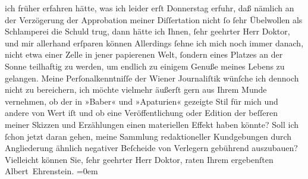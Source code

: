 \begin{ledgroupsized}[t]{13cm}
                    ich früher erfahren hätte, was ich leider erſt Donnerstag erfuhr,
                    daß nämlich an der Verzögerung der Approbation {\pb}meiner
                        Diſſertation nicht ſo
                    ſehr Übelwollen als Schlamperei die Schuld trug, dann hätte ich Ihnen, ſehr
                    geehrter Herr Doktor, und mir allerhand erſparen können{\dotsfour} Allerdings ſehne ich mich noch immer danach, nicht etwa einer Zelle
                    in jener papierenen Welt, ſondern eines Platzes an der Sonne teilhaftig zu
                    werden, um endlich zu einigem Genuße meines Lebens zu gelangen. Meine
                    Perſonalkenntniſſe der Wiener Journaliſtik
                    wünſche ich dennoch nicht zu bereichern, ich möchte vielmehr äußerſt gern aus
                    Ihrem Munde vernehmen, ob der in »Baber« und
                        »Apaturien« gezeigte Stil für mich und
                    andere von Wert iſt und ob eine Veröffentlichung oder Edition der beſſeren
                    meiner Skizzen und Erzählungen einen materiellen Effekt haben könnte? Soll ich
                    ſchon jetzt daran gehen, meine Sammlung redaktioneller Kundgebungen durch
                    Angliederung ähnlich negativer Beſcheide von Verlegern gebührend auszubauen?
                    Vielleicht können Sie, ſehr geehrter Herr Doktor, raten\pend
           \pstart
           Ihrem ergebenſten{\\[\baselineskip]}\spacefill\mbox{Albert Ehrenstein.}\pend
           \leftskip=0em{}
         
         \endnumbering{}\end{ledgroupsized}  \newcommand{\dateiname}{L01880}\newcommand{\titel}{Albert Ehrenstein an Arthur Schnitzler, 17. 10. 1909}\newcommand{\editorInnen}{Martin Anton Müller und Gerd-Hermann Susen}
      